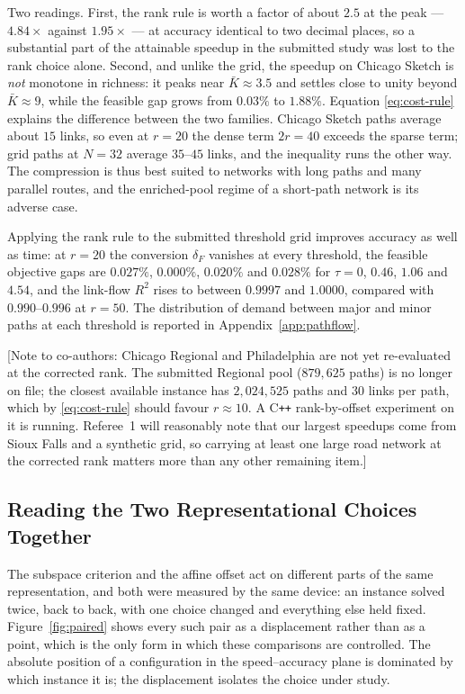 \documentclass[11pt]{article}
\newcommand{\conote}[1]{{\color{red}\small\textsf{[Note to co-authors: #1]}}}
\begin{document}
Two readings. First, the rank rule is worth a factor of about $2.5$ at the peak --- $4.84
\times$ against $1.95\times$ --- at accuracy identical to two decimal places, so a
substantial part of the attainable speedup in the submitted study was lost to the rank
choice alone. Second, and unlike the grid, the speedup on Chicago Sketch is \emph{not}
monotone in richness: it peaks near $\bar K\approx3.5$ and settles close to unity beyond
$\bar K\approx9$, while the feasible gap grows from $0.03\%$ to $1.88\%$. Equation
\eqref{eq:cost-rule} explains the difference between the two families. Chicago Sketch paths
average about $15$ links, so even at $r=20$ the dense term $2r=40$ exceeds the sparse term;
grid paths at $N=32$ average $35$--$45$ links, and the inequality runs the other way. The
compression is thus best suited to networks with long paths and many parallel routes, and the
enriched-pool regime of a short-path network is its adverse case.

Applying the rank rule to the submitted threshold grid improves accuracy as well as time: at
$r=20$ the conversion $\delta_F$ vanishes at every threshold, the feasible objective gaps are
$0.027\%$, $0.000\%$, $0.020\%$ and $0.028\%$ for $\tau=0$, $0.46$, $1.06$ and $4.54$, and
the link-flow $R^2$ rises to between $0.9997$ and $1.0000$, compared with $0.990$--$0.996$ at
$r=50$. The distribution of demand between major and minor paths at each threshold is
reported in Appendix~\ref{app:pathflow}.

\conote{Chicago Regional and Philadelphia are not yet re-evaluated at the corrected rank. The
submitted Regional pool ($879{,}625$ paths) is no longer on file; the closest available
instance has $2{,}024{,}525$ paths and $30$ links per path, which by \eqref{eq:cost-rule}
should favour $r\approx10$. A C\texttt{++} rank-by-offset experiment on it is running.
Referee~1 will reasonably note that our largest speedups come from Sioux Falls and a synthetic
grid, so carrying at least one large road network at the corrected rank matters more than any
other remaining item.}


\subsection{Reading the Two Representational Choices Together}
\label{sec:tradeoff}

The subspace criterion and the affine offset act on different parts of the same representation,
and both were measured by the same device: an instance solved twice, back to back, with one
choice changed and everything else held fixed. Figure~\ref{fig:paired} shows every such pair as
a displacement rather than as a point, which is the only form in which these comparisons are
controlled. The absolute position of a configuration in the speed--accuracy plane is dominated
by which instance it is; the displacement isolates the choice under study.
\end{document}
